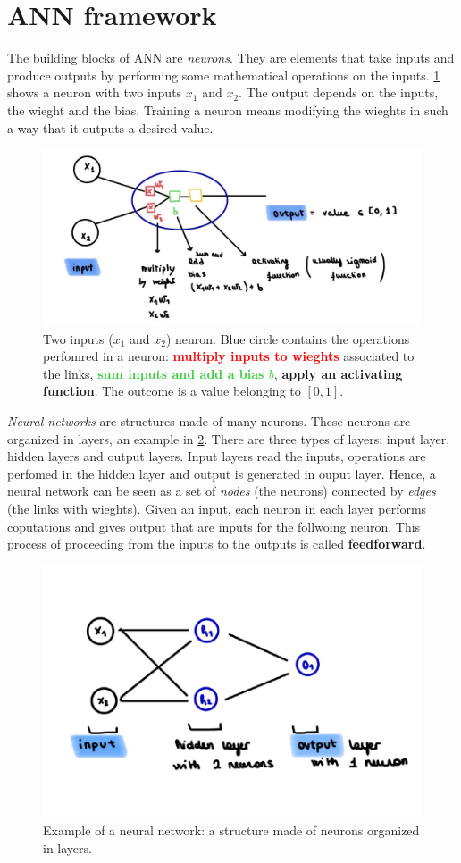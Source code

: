 \documentclass[11pt]{article}
\begin{document}
\newpage

\section{ANN framework}

The building blocks of ANN are \textit{neurons}. They are elements that take inputs and produce outputs by performing some mathematical operations on the inputs. \cref{fig:neuron} shows a neuron with two inputs $x_1$ and $x_2$. The output depends on the inputs, the wieght and the bias. Training a neuron means modifying the wieghts in such a way that it outputs a desired value.
\begin{figure}[h]
    \centering
    \includegraphics[width=0.75\columnwidth]{../figures_tex/neuron.png}
\caption{Two inputs ($x_1$ and $x_2$) neuron. Blue circle contains the operations perfomred in a neuron: \textcolor{red}{\textbf{multiply inputs to wieghts}} associated to the links, \textcolor{LimeGreen}{\textbf{sum inputs and add a bias $b$}}, \textcolor{Dandelion}{\textbf{apply an activating function}}. The outcome is a value belonging to $[0,1]$.}
    \label{fig:neuron}
\end{figure} 

\textit{Neural networks} are structures made of many neurons. These neurons are organized in layers, an example in \cref{fig:neural_ntw}. There are three types of layers: input layer, hidden layers and output layers. Input layers read the inputs, operations are perfomed in the hidden layer and output is generated in ouput layer. Hence, a neural network can be seen as a set of \textit{nodes} (the neurons) connected by \textit{edges} (the links with wieghts).
Given an input, each neuron in each layer performs coputations and gives output that are inputs for the follwoing neuron. This process of proceeding from the inputs to the outputs is called \textbf{feedforward}.
\begin{figure}[h]
    \centering
    \includegraphics[width=0.6\columnwidth]{../figures_tex/neural_ntw.pdf}
    \caption{Example of a neural network: a structure made of neurons organized in layers.}
    \label{fig:neural_ntw}
\end{figure} 
\end{document}
